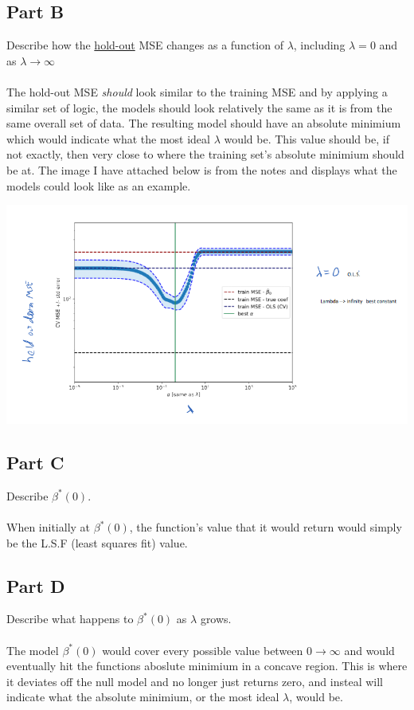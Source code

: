 \documentclass[12pt]{article}
\begin{document}
\subsection{Part B}
Describe how the \underline{hold-out} MSE changes as a function of $\lambda$, including $\lambda = 0$ and as $\lambda \rightarrow \infty$\\\\
The hold-out MSE \emph{should} look similar to the training MSE and by applying a similar set of logic, the models should look relatively the same as it is from the same overall set of data. The resulting model should have an absolute minimium which would indicate what the most ideal $\lambda$ would be. This value should be, if not exactly, then very close to where the training set's absolute minimium should be at. The image I have attached below is from the notes and displays what the models could look like as an example.
\begin{center}\includegraphics[width=1\textwidth]{p1.b.png}\end{center}

\subsection{Part C}
Describe $\beta^*(0)$.\\\\
When initially at $\beta^*(0)$, the function's value that it would return would simply be the L.S.F (least squares fit) value.

\subsection{Part D}
Describe what happens to $\beta^*(0)$ as $\lambda$ grows.\\\\
The model $\beta^*(0)$ would cover every possible value between $0\rightarrow\infty$ and would eventually hit the functions aboslute minimium in a concave region. This is where it deviates off the null model and no longer just returns zero, and insteal will indicate what the absolute minimium, or the most ideal $\lambda$, would be.
\end{document}
